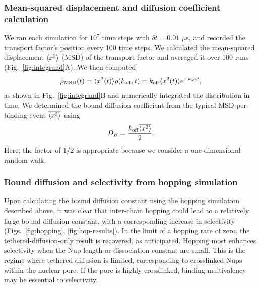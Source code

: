 \subsubsection{Mean-squared displacement and diffusion coefficient calculation}
We ran each simulation for $10^7$ time steps with $\delta t = 0.01$ $\mu$s, and recorded the transport factor's position every 100 time steps.  We calculated the mean-squared displacement $\langle x^2 \rangle$ (MSD) of the transport factor and averaged it over 100 runs (Fig.~\ref{fig:integrand}A).  We then computed
\begin{equation}
\rho_{\mathrm{MSD}} (t)= \langle x^2(t) \rangle \rho(k_{\rm off},t) = k_{\rm off} \langle x^2(t) \rangle
e^{-k_{\rm off} t}, 
\end{equation}
as shown in Fig.~\ref{fig:integrand}B and numerically integrated the distribution in time. We determined the bound diffusion coefficient from the typical MSD-per-binding-event $\overline{\langle x^2 \rangle}$ using
\begin{equation}
D_B = \frac{k_{\rm off} \overline{\langle x^2 \rangle}}{2}. 
\end{equation}   
Here, the factor of $1/2$ is appropriate because we consider a one-dimensional random walk.



\subsubsection{Bound diffusion and selectivity from hopping simulation}

Upon calculating the bound diffusion constant using the hopping simulation described above, it was clear that inter-chain hopping could lead to a relatively large bound diffusion constant, with a corresponding increase in selectivity (Figs.~\ref{fig:hopping}, \ref{fig:hop-results}).  In the limit of a hopping rate of zero, the tethered-diffusion-only result is recovered, as anticipated.  Hopping most enhances selectivity when the Nup length or dissociation constant are small.  This is the regime where tethered diffusion is limited, corresponding to crosslinked Nups within the nuclear pore.  If the pore is highly crosslinked, binding multivalency may be essential to selectivity.

